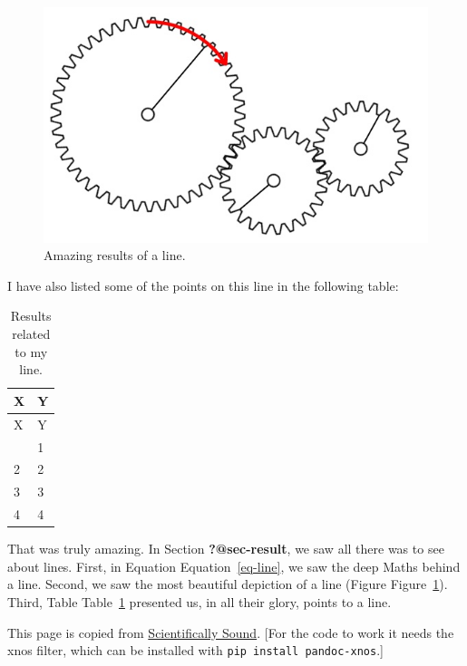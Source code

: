\documentclass[
  letterpaper,
  DIV=11,
  numbers=noendperiod]{scrreprt}
\begin{document}
\begin{figure}

{\centering \includegraphics{static/gear_box.jpg}

}

\caption{\label{fig-line}Amazing results of a line.}

\end{figure}

I have also listed some of the points on this line in the following
table:

\hypertarget{tbl-line}{}
\begin{longtable}[]{@{}ll@{}}
\caption{\label{tbl-line}Results related to my line.}\tabularnewline
\toprule\noalign{}
X & Y \\
\midrule\noalign{}
\endfirsthead
\toprule\noalign{}
X & Y \\
\midrule\noalign{}
\endhead
\bottomrule\noalign{}
\endlastfoot
1 & 1 \\
2 & 2 \\
3 & 3 \\
4 & 4 \\
\end{longtable}

That was truly amazing. In Section \textbf{?@sec-result}, we saw all
there was to see about lines. First, in Equation Equation~\ref{eq-line},
we saw the deep Maths behind a line. Second, we saw the most beautiful
depiction of a line (Figure Figure~\ref{fig-line}). Third, Table
Table~\ref{tbl-line} presented us, in all their glory, points to a line.

This page is copied from
\href{https://scientificallysound.org/2021/12/28/cross-referencing-in-pandoc-and-markdown-with-x/}{Scientifically
Sound}. {[}For the code to work it needs the xnos filter, which can be
installed with \texttt{pip\ install\ pandoc-xnos}.{]}
\end{document}
